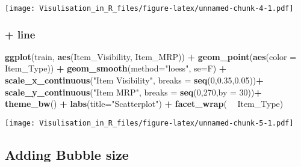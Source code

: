 \documentclass[]{article}
\newenvironment{Shaded}{\begin{snugshade}}{\end{snugshade}}
\newcommand{\KeywordTok}[1]{\textcolor[rgb]{0.13,0.29,0.53}{\textbf{#1}}}
\newcommand{\DataTypeTok}[1]{\textcolor[rgb]{0.13,0.29,0.53}{#1}}
\newcommand{\DecValTok}[1]{\textcolor[rgb]{0.00,0.00,0.81}{#1}}
\newcommand{\FloatTok}[1]{\textcolor[rgb]{0.00,0.00,0.81}{#1}}
\newcommand{\StringTok}[1]{\textcolor[rgb]{0.31,0.60,0.02}{#1}}
\newcommand{\OperatorTok}[1]{\textcolor[rgb]{0.81,0.36,0.00}{\textbf{#1}}}
\newcommand{\NormalTok}[1]{#1}
\begin{document}
\texttt{[image: Visulisation\_in\_R\_files/figure-latex/unnamed-chunk-4-1.pdf]}

\subsubsection{+ line}\label{line}

\begin{Shaded}
\begin{Highlighting}[]
\KeywordTok{ggplot}\NormalTok{(train, }\KeywordTok{aes}\NormalTok{(Item_Visibility, Item_MRP)) }\OperatorTok{+}\StringTok{ }\KeywordTok{geom_point}\NormalTok{(}\KeywordTok{aes}\NormalTok{(}\DataTypeTok{color =}\NormalTok{ Item_Type)) }\OperatorTok{+}\StringTok{ }
\StringTok{  }\KeywordTok{geom_smooth}\NormalTok{(}\DataTypeTok{method=}\StringTok{"loess"}\NormalTok{, }\DataTypeTok{se=}\NormalTok{F) }\OperatorTok{+}\StringTok{ }
\StringTok{  }\KeywordTok{scale_x_continuous}\NormalTok{(}\StringTok{"Item Visibility"}\NormalTok{, }\DataTypeTok{breaks =} \KeywordTok{seq}\NormalTok{(}\DecValTok{0}\NormalTok{,}\FloatTok{0.35}\NormalTok{,}\FloatTok{0.05}\NormalTok{))}\OperatorTok{+}
\StringTok{  }\KeywordTok{scale_y_continuous}\NormalTok{(}\StringTok{"Item MRP"}\NormalTok{, }\DataTypeTok{breaks =} \KeywordTok{seq}\NormalTok{(}\DecValTok{0}\NormalTok{,}\DecValTok{270}\NormalTok{,}\DataTypeTok{by =} \DecValTok{30}\NormalTok{))}\OperatorTok{+}
\StringTok{  }\KeywordTok{theme_bw}\NormalTok{() }\OperatorTok{+}\StringTok{ }\KeywordTok{labs}\NormalTok{(}\DataTypeTok{title=}\StringTok{"Scatterplot"}\NormalTok{) }\OperatorTok{+}\StringTok{ }\KeywordTok{facet_wrap}\NormalTok{( }\OperatorTok{~}\StringTok{ }\NormalTok{Item_Type)}
\end{Highlighting}
\end{Shaded}

\texttt{[image: Visulisation\_in\_R\_files/figure-latex/unnamed-chunk-5-1.pdf]}

\subsection{Adding Bubble size}\label{adding-bubble-size}
\end{document}
